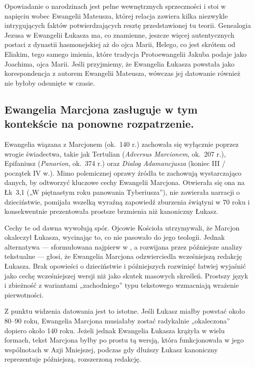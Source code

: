 Opowiadanie o narodzinach jest pełne wewnętrznych sprzeczności i stoi w napięciu wobec Ewangelii Mateusza, której relacja zawiera kilka niezwykle intrygujących faktów potwierdzających resztę przedstawionej tu teorii.
Genealogia Jezusa w Ewangelii Łukasza ma, co znamienne, jeszcze więcej autentycznych postaci z dynastii hasmonejskiej aż do ojca Marii, Helego, co jest skrótem od Eliakim, tego samego imienia, które tradycja Protoewangelii Jakuba podaje jako Joachima, ojca Marii.
Jeśli przyjmiemy, że Ewangelia Łukasza powstała jako korespondencja z autorem Ewangelii Mateusza, wówczas jej datowanie również nie byłoby odsunięte w czasie.

\subsection{Ewangelia Marcjona zasługuje w tym kontekście na ponowne rozpatrzenie.}\label{subsec:the-gospel-of-marcion-deserves-another-look-in-this-context.}

Ewangelia wiązana z Marcjonem (ok.~140 r.) zachowała się wyłącznie poprzez wrogie świadectwa, takie jak Tertulian (\emph{Adversus Marcionem}, ok.~207 r.), Epifaniusz (\emph{Panarion}, ok.~374 r.) oraz \emph{Dialog Adamancjusza} (koniec III / początek IV w.).
Mimo polemicznej oprawy źródła te zachowują wystarczająco danych, by odtworzyć kluczowe cechy Ewangelii Marcjona.
Otwierała się ona na Łk~3,1 („W piętnastym roku panowania Tyberiusza”), nie zawierała narracji o dzieciństwie, pomijała wszelką wyraźną zapowiedź zburzenia świątyni w 70 roku i konsekwentnie prezentowała prostsze brzmienia niż kanoniczny Łukasz.

Cechy te od dawna wywołują spór.
Ojcowie Kościoła utrzymywali, że Marcjon okaleczył Łukasza, wycinając to, co nie pasowało do jego teologii.
Jednak alternatywa --- sformułowana najpierw w \cite{harnack:marcion}, a rozwijana przez późniejsze analizy tekstualne --- głosi, że Ewangelia Marcjona odzwierciedla wcześniejszą redakcję Łukasza.
Brak opowieści o dzieciństwie i późniejszych rozwinięć łatwiej wyjaśnić jako cechę wcześniejszej wersji niż jako skutek masowych skreśleń.
Prostszy język i zbieżność z wariantami „zachodniego” typu tekstowego wzmacniają wrażenie pierwotności.

Z punktu widzenia datowania jest to istotne.
Jeśli Łukasz miałby powstać około 80–90 roku, Ewangelia Marcjona musiałaby zostać radykalnie „okaleczona” dopiero około 140 roku.
Jeżeli jednak Ewangelia Łukasza krążyła w wielu formach, tekst Marcjona byłby po prostu tą wersją, która funkcjonowała w jego wspólnotach w Azji Mniejszej, podczas gdy dłuższy Łukasz kanoniczny reprezentuje późniejszą, rozszerzoną redakcję.

